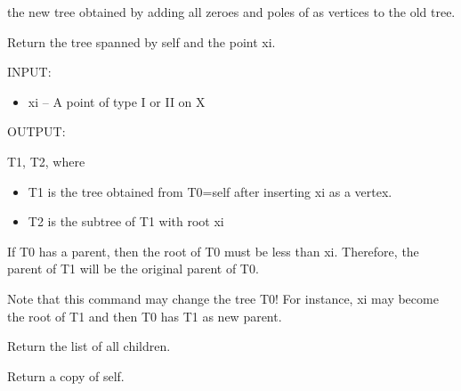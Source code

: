 \documentclass[letterpaper,10pt,english]{sphinxmanual}
\begin{document}
\begin{fulllineitems}
\begin{fulllineitems}
the new tree obtained by adding all zeroes and poles of  as 
vertices to the old tree.

\end{fulllineitems}


\begin{fulllineitems}
\label{berkovich_trees:mclf.berkovich.berkovich_trees.BerkovichTree.add_point}
Return the tree spanned by self and the point xi.

INPUT:
\begin{itemize}
\item {} 
xi -- A point of type I or II on X

\end{itemize}

OUTPUT:

T1, T2, where
\begin{itemize}
\item {} 
T1 is the tree obtained from T0=self after inserting xi as a vertex.

\item {} 
T2 is the subtree of T1 with root xi

\end{itemize}

If T0 has a parent, then the root of T0 must be less than xi.
Therefore, the parent of T1 will be the original parent of T0.

Note that this command may change the tree T0!  For instance, xi may
become the root of T1 and then T0 has T1 as new parent.

\end{fulllineitems}


\begin{fulllineitems}
\label{berkovich_trees:mclf.berkovich.berkovich_trees.BerkovichTree.children}
Return the list of all children.

\end{fulllineitems}


\begin{fulllineitems}
\label{berkovich_trees:mclf.berkovich.berkovich_trees.BerkovichTree.copy}
Return a copy of self.


\end{fulllineitems}
\end{fulllineitems}
\end{document}
